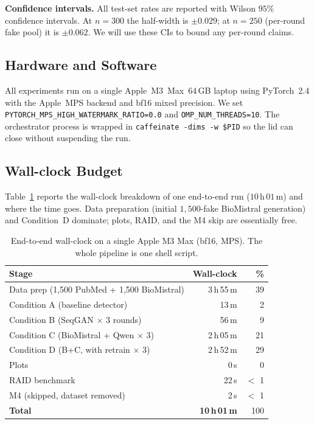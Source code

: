 \documentclass[conference]{IEEEtran}
\begin{document}
\textbf{Confidence intervals.} All test-set rates are reported with Wilson
\(95\%\) confidence intervals. At \(n=300\) the half-width is
\(\pm 0.029\); at \(n=250\) (per-round fake pool) it is \(\pm 0.062\).
We will use these CIs to bound any per-round claims.

\subsection{Hardware and Software}
\label{ssec:hardware}
All experiments run on a single Apple~M3~Max~64\,GB laptop using
PyTorch~2.4 with the Apple~MPS backend and bf16 mixed precision. We set
\texttt{PYTORCH\_MPS\_HIGH\_WATERMARK\_RATIO=0.0} and
\texttt{OMP\_NUM\_THREADS=10}. The orchestrator process is wrapped in
\texttt{caffeinate -dims -w \$PID} so the lid can close without
suspending the run.

\subsection{Wall-clock Budget}
\label{ssec:walltime}
Table~\ref{tab:walltime} reports the wall-clock breakdown of one
end-to-end run (\(10\,\mathrm{h}\,01\,\mathrm{m}\)) and where the time
goes. Data preparation (initial \(1{,}500\)-fake BioMistral generation)
and Condition~D dominate; plots, RAID, and the M4 skip are essentially
free.

\begin{table}[t]
\caption{End-to-end wall-clock on a single Apple M3 Max
(bf16, MPS). The whole pipeline is one shell script.}
\label{tab:walltime}
\centering
\renewcommand{\arraystretch}{1.1}
\begin{tabular}{@{}lrr@{}}
\toprule
\textbf{Stage} & \textbf{Wall-clock} & \textbf{\%} \\
\midrule
Data prep (1{,}500 PubMed + 1{,}500 BioMistral)
                                & 3\,h\,55\,m & 39 \\
Condition A (baseline detector) & 13\,m       &  2 \\
Condition B (SeqGAN $\times$ 3 rounds)
                                & 56\,m       &  9 \\
Condition C (BioMistral + Qwen $\times$ 3)
                                & 2\,h\,05\,m & 21 \\
Condition D (B+C, with retrain $\times$ 3)
                                & 2\,h\,52\,m & 29 \\
Plots                           & 0\,s        & 0 \\
RAID benchmark                  & 22\,s       & $<$ 1 \\
M4 (skipped, dataset removed)   & 2\,s        & $<$ 1 \\
\midrule
\textbf{Total}                  & \textbf{10\,h\,01\,m} & 100 \\
\bottomrule
\end{tabular}
\end{table}
\end{document}
